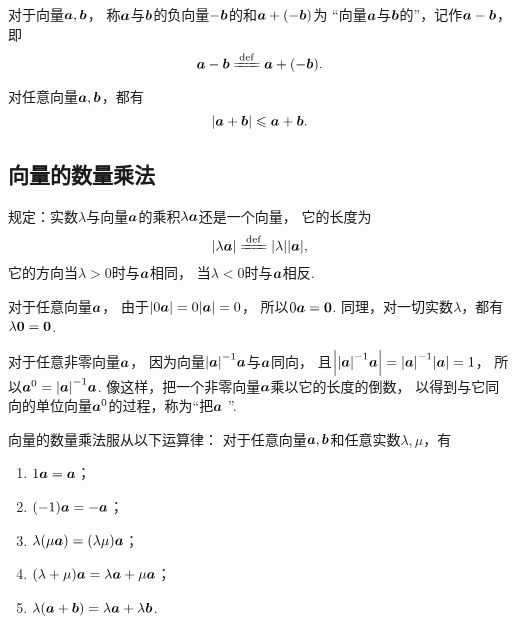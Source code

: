 \begin{definition}
对于向量\(\boldsymbol{a},\boldsymbol{b}\)，
称\(\boldsymbol{a}\)与\(\boldsymbol{b}\)的负向量\(-\boldsymbol{b}\)的和\(\boldsymbol{a}+(-\boldsymbol{b})\)为
“向量\(\boldsymbol{a}\)与\(\boldsymbol{b}\)的”，记作\(\boldsymbol{a}-\boldsymbol{b}\)，即\[
	\mat{a}-\mat{b}
	\defeq
	\mat{a}+(-\mat{b}).
\]
\end{definition}

\begin{theorem}
对任意向量\(\boldsymbol{a},\boldsymbol{b}\)，都有\[
\abs{\boldsymbol{a}+\boldsymbol{b}} \leqslant \boldsymbol{a} + \boldsymbol{b}.
\]
\end{theorem}

\subsection{向量的数量乘法}
\begin{definition}
规定：实数\(\lambda\)与向量\(\boldsymbol{a}\)的乘积\(\lambda \boldsymbol{a}\)还是一个向量，
它的长度为\[
\abs{\lambda\mat{a}}
\defeq
\abs{\lambda} \abs{\mat{a}},
\]
它的方向当\(\lambda>0\)时与\(\boldsymbol{a}\)相同，
当\(\lambda<0\)时与\(\boldsymbol{a}\)相反.
\end{definition}

对于任意向量\(\boldsymbol{a}\)，
由于\(\abs{0 \boldsymbol{a}} = 0 \abs{\boldsymbol{a}} = 0\)，
所以\(0 \boldsymbol{a} = \boldsymbol{0}\).
同理，对一切实数\(\lambda\)，都有\(\lambda \boldsymbol{0} = \boldsymbol{0}\).

对于任意非零向量\(\boldsymbol{a}\)，
因为向量\(\abs{\boldsymbol{a}}^{-1} \boldsymbol{a}\)与\(\boldsymbol{a}\)同向，
且\(\abs{\abs{\boldsymbol{a}}^{-1} \boldsymbol{a}}
= \abs{\boldsymbol{a}}^{-1} \abs{\boldsymbol{a}} = 1\)，
所以\(\boldsymbol{a}^0 = \abs{\boldsymbol{a}}^{-1} \boldsymbol{a}\).
像这样，把一个非零向量\(\boldsymbol{a}\)乘以它的长度的倒数，
以得到与它同向的单位向量\(\boldsymbol{a}^0\)的过程，称为“把\(\boldsymbol{a}\) ”.

向量的数量乘法服从以下运算律：
对于任意向量\(\boldsymbol{a},\boldsymbol{b}\)和任意实数\(\lambda,\mu\)，有
\begin{enumerate}
	\item \(1 \boldsymbol{a} = \boldsymbol{a}\)；
	\item \((-1) \boldsymbol{a} = -\boldsymbol{a}\)；
	\item \(\lambda(\mu \boldsymbol{a}) = (\lambda \mu) \boldsymbol{a}\)；
	\item \((\lambda+\mu) \boldsymbol{a} = \lambda \boldsymbol{a} + \mu \boldsymbol{a}\)；
	\item \(\lambda (\boldsymbol{a}+\boldsymbol{b}) = \lambda \boldsymbol{a} + \lambda \boldsymbol{b}\).
\end{enumerate}


